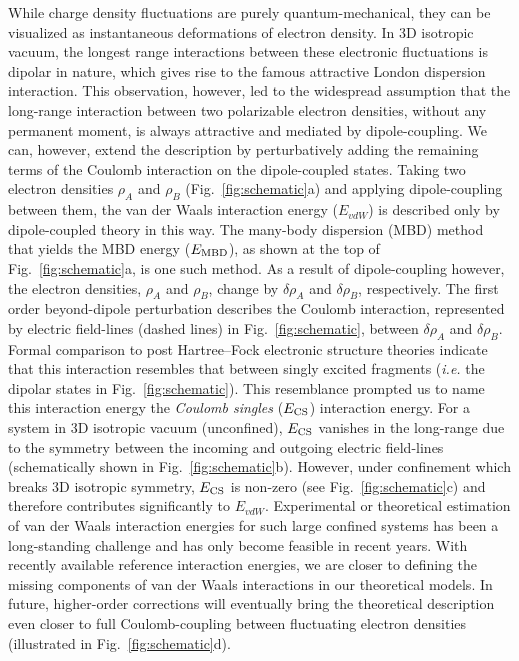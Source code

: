 \documentclass[aps,prl,groupaddress, twocolumn]{revtex4-1}  %
\begin{document}
While charge density fluctuations are purely quantum-mechanical, they can be visualized as instantaneous deformations of electron density. In 3D isotropic vacuum, the longest range interactions between these electronic fluctuations is dipolar in nature, which gives rise to the famous attractive London dispersion interaction. This observation, however, led to the widespread assumption that the long-range interaction between two polarizable electron densities, without any permanent moment, is always attractive and mediated by dipole-coupling. We can, however, extend the description by perturbatively adding the remaining terms of the Coulomb interaction on the dipole-coupled states\cite{sadhukhan_prl_2017}. Taking two electron densities $\rho_A$ and $\rho_B$ (Fig.~\ref{fig:schematic}a) and applying dipole-coupling between them, the van der Waals interaction energy ($E_{vdW}$) is described only by dipole-coupled theory in this way. The many-body dispersion (MBD) method that yields the MBD energy ($E_{\rm MBD}$), as shown at the top of Fig.~\ref{fig:schematic}a, is one such method. As a result of dipole-coupling however, the electron densities, $\rho_A$ and $\rho_B$, change by $\delta \rho_A$ and $\delta \rho_B$, respectively. The first order beyond-dipole perturbation describes the Coulomb interaction, represented by electric field-lines (dashed lines) in Fig.~\ref{fig:schematic}, between $\delta \rho_A$ and $\delta \rho_B$. Formal comparison to post Hartree--Fock electronic structure theories indicate that this interaction resembles that between singly excited fragments (\textit{i.e.} the dipolar states in Fig.~\ref{fig:schematic}). This resemblance prompted us to name this interaction energy the \textit{Coulomb singles} ($E_{\rm CS}$) interaction energy. For a system in 3D isotropic vacuum (unconfined), $E_{\rm CS}$ vanishes in the long-range due to the symmetry between the incoming and outgoing electric field-lines (schematically shown in Fig.~\ref{fig:schematic}b). However, under confinement which breaks 3D isotropic symmetry, $E_{\rm CS}$ is non-zero (see Fig.~\ref{fig:schematic}c) and therefore contributes significantly to $E_{vdW}$. Experimental or theoretical estimation of van der Waals interaction energies for such large confined systems has been a long-standing challenge and has only become feasible in recent years. With recently available reference interaction energies, we are closer to defining the missing components of van der Waals interactions in our theoretical models. In future, higher-order corrections will eventually bring the theoretical description even closer to full Coulomb-coupling between fluctuating electron densities (illustrated in Fig.~\ref{fig:schematic}d).
\end{document}
